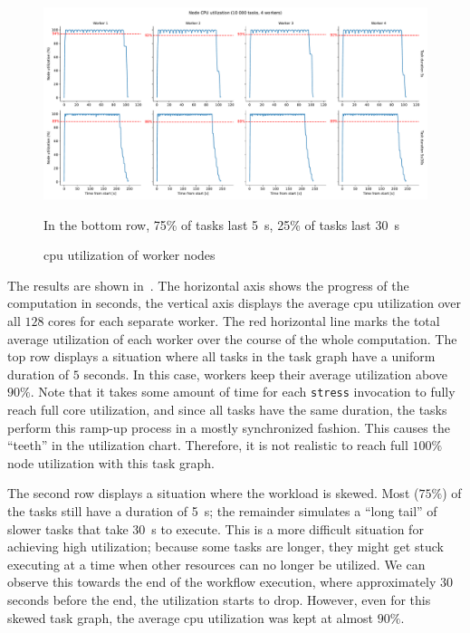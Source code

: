 \begin{figure}[h]
	\centering
	\includegraphics[width=\textwidth]{imgs/hq/charts/scalability-stress-utilization}

	In the bottom row, 75\% of tasks last \SI{5}{\second}, 25\% of tasks last
	\SI{30}{\second} \caption{\acrshort{cpu} utilization of \hyperqueue{} worker nodes} \label{fig:hq-cpu-utilization}
\end{figure}

The results are shown in~. The horizontal axis shows the progress of the
computation in seconds, the vertical axis displays the average \gls{cpu} utilization
over all $128$ cores for each separate worker. The red horizontal line marks the
total average utilization of each worker over the course of the whole computation. The top row
displays a situation where all tasks in the task graph have a uniform duration of
$5$ seconds. In this case, \hyperqueue{} workers keep their average
utilization above $90\%$. Note that it takes some amount of time for each
\texttt{stress} invocation to fully reach full core utilization, and since all tasks have
the same duration, the tasks perform this ramp-up process in a mostly synchronized fashion. This
causes the ``teeth'' in the utilization chart. Therefore, it is not realistic to reach full
$100\%$ node utilization with this task graph.

The second row displays a situation where the workload is skewed. Most ($75\%$) of
the tasks still have a duration of \SI{5}{\second}; the remainder simulates a ``long tail''
of slower tasks that take \SI{30}{\second} to execute. This is a more difficult situation
for achieving high utilization; because some tasks are longer, they might get stuck executing at a
time when other resources can no longer be utilized. We can observe this towards the end of the
workflow execution, where approximately $30$ seconds before the end, the
utilization starts to drop. However, even for this skewed task graph, the average
\gls{cpu} utilization was kept at almost $90\%$.

